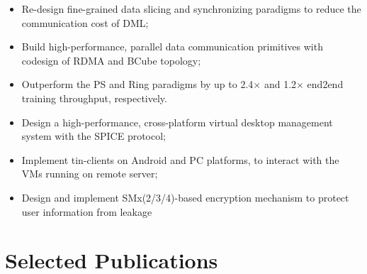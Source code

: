 \documentclass{resume}
\begin{document}
\begin{itemize}
	\item Re-design fine-grained data slicing and synchronizing paradigms to reduce the communication cost of DML;
	\item Build high-performance, parallel data communication primitives with codesign of RDMA and BCube topology;
	\item Outperform the PS and Ring paradigms by up to 2.4$\times$ and 1.2$\times$ end2end training throughput, respectively.
\end{itemize}

\begin{itemize}
	\item Design a high-performance, cross-platform virtual desktop management system with the SPICE protocol;
	\item Implement tin-clients on Android and PC platforms,  to interact with the VMs running on remote server;
	\item Design and implement SMx(2/3/4)-based encryption mechanism to protect user information from leakage
\end{itemize}


\section{Selected Publications}
\end{document}
